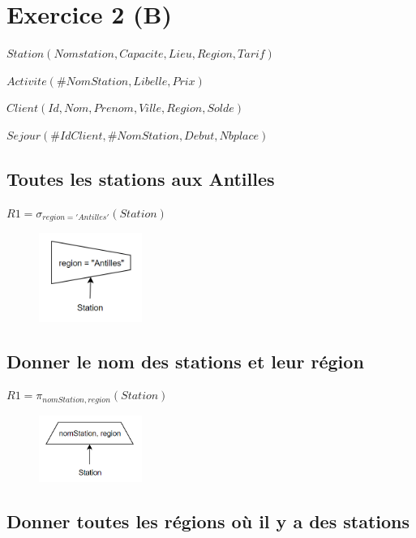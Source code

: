 \documentclass{article}
\begin{document}
\break\section{Exercice 2 (B)}

$ Station (Nomstation, Capacite, Lieu, Region, Tarif) $

$ Activite (\#NomStation, Libelle, Prix) $

$ Client (Id, Nom, Prenom, Ville, Region, Solde) $

$ Sejour (\#IdClient, \#NomStation, Debut, Nbplace) $

\subsection{Toutes les stations aux Antilles}

$ R1 = \sigma_{region = 'Antilles'}(Station)$

\begin{figure}[H]
  \centering
  \includegraphics[width=0.3\textwidth]{imgAlgGraph/1.png}
  \label{fig:1}
\end{figure}

\subsection{Donner le nom des stations et leur région}

$ R1 = \pi_{nomStation, region}(Station)$

\begin{figure}[H]
  \centering
  \includegraphics[width=0.3\textwidth]{imgAlgGraph/2.png}
  \label{fig:2}
\end{figure}

\subsection{Donner toutes les régions où il y a des stations}
\end{document}
